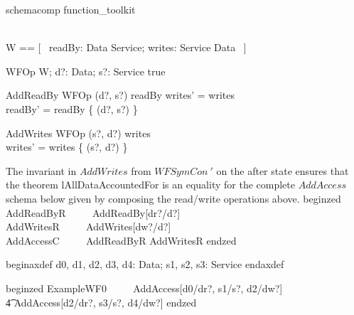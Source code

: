 \begin{zsection}
\SECTION schemacomp \parents function\_toolkit
\end{zsection}

\begin{zed}
\\
    W == [~ readBy: Data \rel Service; writes: Service \rel Data ~]
\end{zed}

\begin{schema}{WFOp}
	\Delta W; d?: Data; s?: Service 
\where
  true
\end{schema}%
%
\begin{schema}{AddReadBy}
   WFOp
\where
   (d?, s?) \in readBy \land writes' = writes 
   \\
   readBy' = readBy \cup \{ (d?, s?) \} 
\end{schema}%
%
\begin{schema}{AddWrites}
   WFOp 
\where
   (s?, d?) \in writes
   \\
   writes' = writes \cup \{ (s?, d?) \}  
\end{schema}%
%
The invariant in $AddWrites$ from $WFSymCon~'$ on the after state ensures that the theorem \textsf{lAllDataAccountedFor} 
is an equality for the complete $AddAccess$ schema below given by composing the read/write operations above. 
%
begin{zed}
   AddReadByR ~~~~ AddReadBy[dr?/d?]
   \\
   AddWritesR ~~~~ AddWrites[dw?/d?]
   \\
   AddAccessC ~~~~ AddReadByR \semi AddWritesR
end{zed}%

begin{axdef}
   d0, d1, d2, d3, d4: Data; s1, s2, s3: Service
end{axdef}

begin{zed}
	ExampleWF0 ~~~~ AddAccess[d0/dr?, s1/s?, d2/dw?] \semi \\
               		\t4 AddAccess[d2/dr?, s3/s?, d4/dw?]
end{zed}